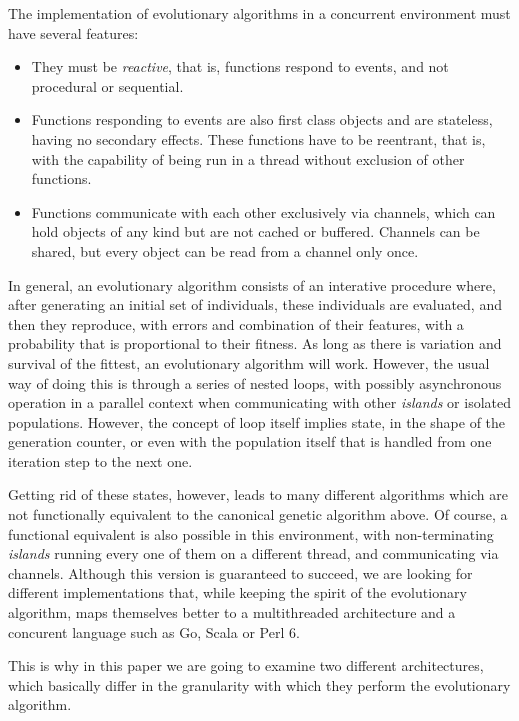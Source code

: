 \documentclass[sigconf]{acmart}
\begin{document}
The implementation of evolutionary algorithms in a concurrent
environment must have several features:\begin{itemize}
\item They must be {\em reactive}, that is, functions respond to
  events, and not procedural or sequential.
\item Functions responding to events are also first class objects and
  are stateless, having no secondary effects. These functions have to
  be reentrant, that is, with the capability of being run in a thread
  without exclusion of other functions.
\item Functions communicate with each other exclusively via channels, which can
  hold objects of any kind but are not cached or buffered. Channels
  can be shared, but every object can be read from a channel only
  once.
\end{itemize}

In general, an evolutionary algorithm consists of an interative
procedure where, after generating an initial set of individuals, these
individuals are evaluated, and then they reproduce, with errors and
combination of their features, with a probability
that is proportional to their fitness. As long as there is variation
and survival of the fittest, an evolutionary algorithm will
work. However, the  usual way of doing this is through a series of
nested loops, with possibly asynchronous operation in a parallel
context when communicating with other {\em islands} or isolated
populations. However, the concept of loop itself implies state, in the
shape of the generation counter, or even with the population itself
that is handled from one iteration step to the next one.

Getting rid of these states, however, leads to many different
algorithms which are not functionally equivalent to the canonical
genetic algorithm above. Of course, a functional equivalent is also
possible in this environment, with non-terminating {\em islands}
running every one of them on a different thread, and communicating via
channels. Although this version is guaranteed to succeed, we are
looking for different implementations that, while keeping the spirit
of the evolutionary algorithm, maps themselves better to a
multithreaded architecture and a concurent language such as Go, Scala
or Perl 6.

This is why in this paper we are going to examine two different
architectures, which basically differ in the granularity with which
they perform the evolutionary algorithm.
\end{document}
